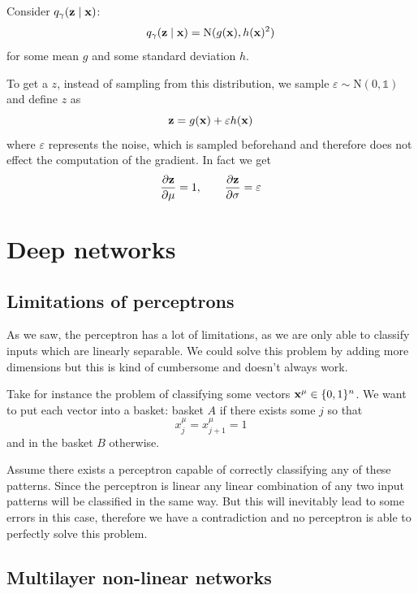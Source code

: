 \documentclass[12pt]{extarticle}
\renewcommand{\vec}[1]{\bvec{#1}}
\begin{document}
Consider $q_\gamma(\vec z \mid \vec x)$:
\begin{equation}
	q_\gamma(\vec z \mid \vec x) = \mathrm N(g(\vec x), h(\vec x)^2)
\end{equation}
for some mean $g$ and some standard deviation $h$.

To get a $z$, instead of sampling from this distribution, we sample
$\varepsilon \sim \mathrm{N}(0, \mathds 1)$ and define $z$ as
\begin{equation}
	\vec z = g(\vec x) + \varepsilon h(\vec x)
\end{equation}
where $\varepsilon$ represents the noise, which is sampled beforehand and therefore does not effect
the computation of the gradient.
In fact we get
\begin{equation}
	\pdv{\vec z}{\mu} = 1, \qquad \pdv{\vec z}{\sigma} = \varepsilon
\end{equation}

\section{Deep networks}

\subsection{Limitations of perceptrons}
As we saw, the perceptron has a lot of limitations, as we are only able to classify inputs which are
linearly separable.
We could solve this problem by adding more dimensions but this is kind of cumbersome and doesn't
always work.

Take for instance the problem of classifying some vectors $\vec x^\mu \in \{0, 1\}^n$.
We want to put each vector into a basket: basket $A$ if there exists some $j$ so that
\begin{equation}
	x^\mu_j = x^\mu_{j+1} = 1
\end{equation}
and in the basket $B$ otherwise.

Assume there exists a perceptron capable of correctly classifying any of these patterns. Since the
perceptron is linear any linear combination of any two input patterns will be classified in the same
way. But this will inevitably lead to some errors in this case, therefore we have a contradiction
and no perceptron is able to perfectly solve this problem.

\subsection{Multilayer non-linear networks}
\end{document}
